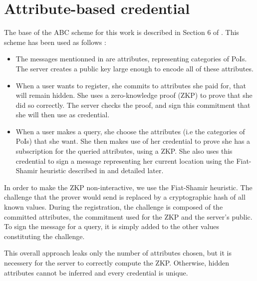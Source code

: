 \documentclass[10pt,conference,compsocconf]{IEEEtran}
\begin{document}
\section{Attribute-based credential}
The base of the ABC scheme for this work is described in Section 6 of \cite{PS_Scheme}. This scheme has been used as follows : 
\begin{itemize}
    \item The messages mentionned in \cite{PS_Scheme} are attributes, representing categories of PoIs. The server creates a public key large enough to encode all of these attributes. 
    \item When a user wants to register, she commits to attributes she paid for, that will remain hidden. She uses a zero-knowledge proof (ZKP) to prove that she did so correctly. The server checks the proof, and sign this commitment that she will then use as credential.
    \item When a user makes a query, she choose the attributes (i.e the categories of PoIs) that she want. She then makes use of her credential to prove she has a subscription for the queried attributes, using a ZKP. She also uses this credential to sign a message representing her current location using the Fiat-Shamir heuristic described in \cite{FSheuristic} and detailed later.
\end{itemize}

In order to make the ZKP non-interactive, we use the Fiat-Shamir heuristic. The challenge that the prover would send is replaced by a cryptographic hash of all known values. During the registration, the challenge is composed of the committed attributes, the commitment used for the ZKP and the server's public. To sign the message for a query, it is simply added to the other values constituting the challenge. 

This overall approach leaks only the number of attributes chosen, but it is necessery for the server to correctly compute the ZKP. Otherwise, hidden attributes cannot be inferred and every credential is unique.
\end{document}
